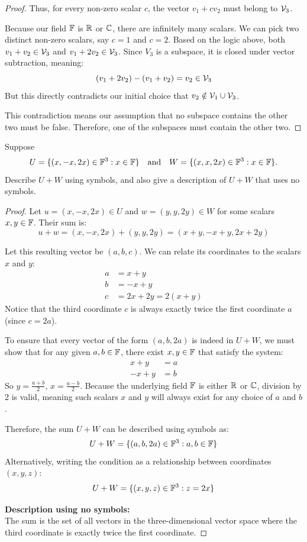 \begin{proof}
	Thus, for every non-zero scalar $c$, the vector $v_1 + c v_2$ must belong to $\mathcal{V}_3$.
	
	Because our field $\mathbb{F}$ is $\mathbb{R}$ or $\mathbb{C}$, there are infinitely many scalars. We can pick two distinct non-zero scalars, say $c = 1$ and $c = 2$.
	Based on the logic above, both $v_1 + v_2 \in \mathcal{V}_3$ and $v_1 + 2v_2 \in \mathcal{V}_3$.
	Since $V_3$ is a subspace, it is closed under vector subtraction, meaning:
	\[ (v_1 + 2v_2) - (v_1 + v_2) = v_2 \in \mathcal{V}_3 \]
	But this directly contradicts our initial choice that $v_2 \notin \mathcal{V}_1 \cup \mathcal{V}_3$. 
	
	This contradiction means our assumption that no subspace contains the other two must be false. Therefore, one of the subspaces must contain the other two.
\end{proof}
\begin{question}
	Suppose
	\[ U = \{(x, -x, 2x) \in \mathbb{F}^3 : x \in \mathbb{F}\} \quad \text{and} \quad W = \{(x, x, 2x) \in \mathbb{F}^3 : x \in \mathbb{F}\}. \]
	Describe $U + W$ using symbols, and also give a description of $U + W$ that uses no symbols.
\end{question}
\begin{proof}
	Let $u = (x, -x, 2x) \in U$ and $w = (y, y, 2y) \in W$ for some scalars $x, y \in \mathbb{F}$. 
	Their sum is:
	\[ u + w = (x, -x, 2x) + (y, y, 2y) = (x + y, -x + y, 2x + 2y) \]
	
	Let this resulting vector be $(a, b, c)$. We can relate its coordinates to the scalars $x$ and $y$:
	\begin{align*}
		a &= x + y \\
		b &= -x + y \\
		c &= 2x + 2y = 2(x + y)
	\end{align*}
	Notice that the third coordinate $c$ is always exactly twice the first coordinate $a$ (since $c = 2a$). 
	
	To ensure that every vector of the form $(a, b, 2a)$ is indeed in $U + W$, we must show that for any given $a, b \in \mathbb{F}$, there exist $x, y \in \mathbb{F}$ that satisfy the system:
	\begin{align*}
		x + y &= a \\
		-x + y &= b
	\end{align*}
	So $y = \frac{a+b}{2}$, $x = \frac{a-b}{2}$. 
	Because the underlying field $\mathbb{F}$ is either $\mathbb{R}$ or $\mathbb{C}$, division by 2 is valid, meaning such scalars $x$ and $y$ will always exist for any choice of $a$ and $b$.
	
	Therefore, the sum $U + W$ can be described using symbols as:
	\[ U + W = \{(a, b, 2a) \in \mathbb{F}^3 : a, b \in \mathbb{F}\} \]
	Alternatively, writing the condition as a relationship between coordinates $(x, y, z)$:
	\[ U + W = \{(x, y, z) \in \mathbb{F}^3 : z = 2x\} \]
	
	\vspace{1em}
	
	\textbf{Description using no symbols:} \\
	The sum is the set of all vectors in the three-dimensional vector space where the third coordinate is exactly twice the first coordinate.
\end{proof}
